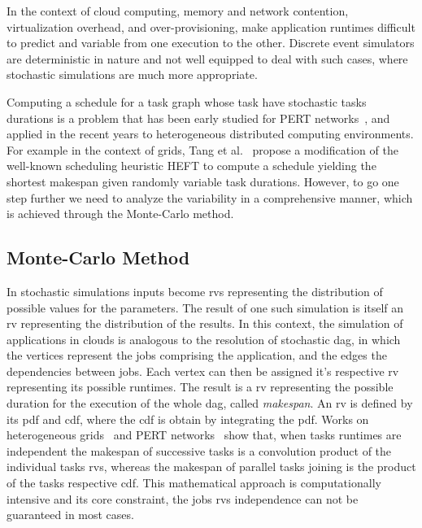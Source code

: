 \documentclass[10pt,conference,compsocconf]{IEEEtran}
\begin{document}
In the context of cloud computing, memory and network contention, virtualization
overhead, and over-provisioning, make  application runtimes difficult to predict
and variable  from one  execution to  the other.  Discrete event  simulators are
deterministic in  nature and not  well equipped to  deal with such  cases, where
stochastic simulations are much more appropriate.

Computing a schedule for a task graph whose task have stochastic tasks durations
is a problem  that has been early studied for  PERT networks~\cite{Slyke63}, and
applied in the recent years to heterogeneous distributed computing environments.
For  example in  the  context  of grids,  Tang  et  al.~\cite{Tang11} propose  a
modification of the  well-known scheduling heuristic HEFT to  compute a schedule
yielding the shortest makespan given randomly variable task durations.  However,
to go  one step further  we need to analyze  the variability in  a comprehensive
manner, which is achieved through the Monte-Carlo method.

\subsection{Monte-Carlo Method}

In stochastic simulations inputs  become \acfp{rv} representing the distribution
of possible  values for the  parameters.  The result  of one such  simulation is
itself an \ac{rv} representing the distribution of the results. In this context,
the  simulation of  applications in  clouds is  analogous to  the resolution  of
stochastic \ac{dag},  in which  the vertices represent  the jobs  comprising the
application, and the  edges the dependencies between jobs. Each  vertex can then
be assigned  it's respective  \ac{rv} representing  its possible  runtimes.  The
result is a \ac{rv} representing the  possible duration for the execution of the
whole \ac{dag},  called \emph{makespan}. An  \ac{rv} is defined by  its \ac{pdf}
and \ac{cdf}, where  the \ac{cdf} is obtain by integrating  the \ac{pdf}.  Works
on heterogeneous grids~\cite{Li97} and  PERT networks~\cite{Ludwig01} show that,
when  tasks runtimes  are  independent the  makespan of  successive  tasks is  a
convolution product  of the individual  tasks \acp{rv}, whereas the  makespan of
parallel tasks  joining is the  product of  the tasks respective  \ac{cdf}. This
mathematical approach is computationally intensive  and its core constraint, the
jobs \acp{rv} independence can not be guaranteed in most cases.
\end{document}
